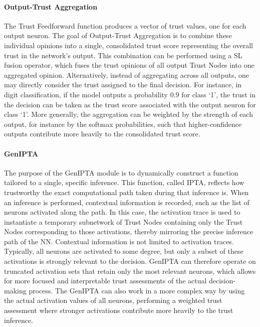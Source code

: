 \paragraph{Output-Trust Aggregation}
The Trust Feedforward function produces a vector of trust values, one for each output neuron. The goal of Output-Trust Aggregation is to combine these individual opinions into a single, consolidated trust score representing the overall trust in the network's output. This combination can be performed using a SL fusion operator, which fuses the trust opinions of all output Trust Nodes into one aggregated opinion. Alternatively, instead of aggregating across all outputs, one may directly consider the trust assigned to the final decision. For instance, in digit classification, if the model outputs a probability \(0.9\) for class ‘1’, the trust in the decision can be taken as the trust score associated with the output neuron for class ‘1’. More generally, the aggregation can be weighted by the strength of each output, for instance by the softmax probabilities, such that higher-confidence outputs contribute more heavily to the consolidated trust score. \DIFaddbegin {}\emph{} \DIFaddend 

\paragraph{\acf{GenIPTA}}

The purpose of the \ac{GenIPTA} module is to dynamically construct a function tailored to a single, specific inference. This function, called \ac{IPTA}, reflects how trustworthy the exact computational path taken during that inference is. When an inference is performed, contextual information is recorded, such as the list of neurons activated along the path. In this case, the activation trace is used to instantiate a temporary subnetwork of Trust Nodes containing only the Trust Nodes corresponding to those activations, thereby mirroring the precise inference path of the \ac{NN}. Contextual information is not limited to activation traces. Typically, all neurons are activated to some degree, but only a subset of these activations is strongly relevant to the decision. \ac{GenIPTA} can therefore operate on truncated activation sets that retain only the most relevant neurons, which allows for more focused and interpretable trust assessments of the actual decision-making process. The \ac{GenIPTA} can also work in a more complex way by using the actual activation values of all neurons, performing a weighted trust assessment where stronger activations contribute more heavily to the trust inference.

